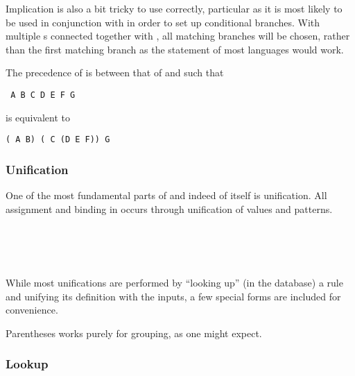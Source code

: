 Implication is also a bit tricky to use correctly, particular as it is most likely
to be used in conjunction with  in order to set up conditional branches.
With multiple s connected together with , all matching branches
will be chosen, rather than the first matching branch as the  statement
of most languages would work.

The precedence of  is between that of  and  such that

\begin{center}
\texttt{ A  B   C  D   E  F  G}
\end{center}

is equivalent to

\begin{center}
\texttt{( A  B)  ( C  (D   E  F))  G}
\end{center}

\subsubsection{Unification}

One of the most fundamental parts of \Law{} and indeed of \Trilogy{} itself
is unification. All assignment and binding in \Trilogy{} occurs through
unification of values and patterns.

\begin{bnf*}
     \\
     \\
     \\
\end{bnf*}

While most unifications are performed by ``looking up'' (in the database)
a rule and unifying its definition with the inputs, a few special forms are
included for convenience.

\begin{prooftree}
\end{prooftree}

Parentheses works purely for grouping, as one might expect.

\subsubsection{Lookup}
